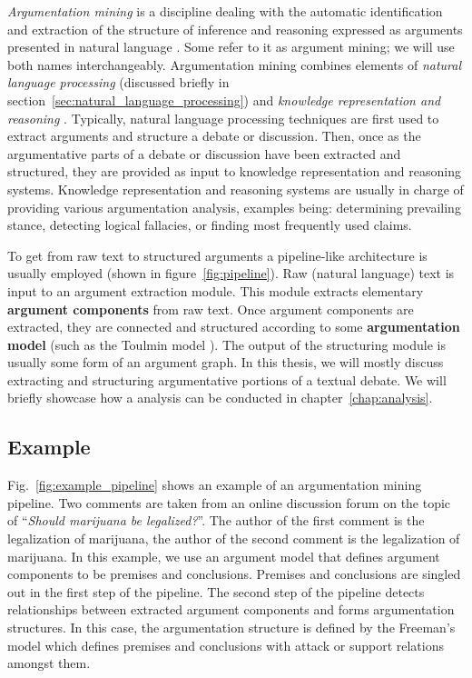 \emph{Argumentation mining} is a discipline dealing with the automatic
identification and extraction of the structure of inference and reasoning
expressed as arguments presented in natural language
\citep{lawrence2019argument}.  Some refer to it as argument mining; we will use
both names interchangeably.  Argumentation mining combines elements of
\emph{natural language processing} (discussed briefly in
section~\ref{sec:natural_language_processing}) and \emph{knowledge
representation and reasoning} \citep{cabrio2018five}.  Typically, natural
language processing techniques are first used to extract arguments and
structure a debate or discussion. Then, once as the argumentative parts of a
debate or discussion have been extracted and structured, they are provided as
input to knowledge representation and reasoning systems.  Knowledge
representation and reasoning systems are usually in charge of providing various
argumentation analysis, examples being: determining prevailing stance,
detecting logical fallacies, or finding most frequently used claims.

To get from raw text to structured arguments a pipeline-like architecture
is usually employed (shown in figure~\ref{fig:pipeline}). 
Raw (natural language) text is input to an argument extraction module. This module
extracts elementary \textbf{argument components} from raw text. 
Once argument components are extracted, they are connected and structured 
according to some \textbf{argumentation model} (such as the Toulmin model \citep{toulmin2003uses}).
The output of the structuring module is usually some form of an argument graph. 
In this thesis, we will mostly discuss extracting and structuring argumentative
portions of a textual debate. We will briefly showcase how a analysis can be
conducted in chapter~\ref{chap:analysis}. 

\subsection{Example}


Fig.~\ref{fig:example_pipeline} shows an example of an argumentation mining
pipeline. Two comments are taken from an online discussion forum on the topic
of ``\emph{Should marijuana be legalized?}''. The author of the first comment
is  the legalization of marijuana, the author of the second
comment is  the legalization of marijuana.  In this example, we use an
argument model that defines argument components to be premises and conclusions.
Premises and conclusions are singled out in the first step of the pipeline.
The second step of the pipeline detects relationships between extracted
argument components and forms argumentation structures. In this case, the
argumentation structure is defined by the Freeman's model
\citep{freeman2011argument} which defines premises and conclusions with attack
or support relations amongst them. 

